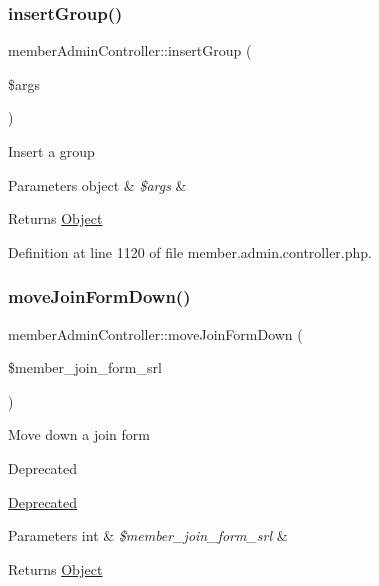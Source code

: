 \subsubsection{\texorpdfstring{insert\+Group()}{insertGroup()}}
{\footnotesize\ttfamily member\+Admin\+Controller\+::insert\+Group (\begin{DoxyParamCaption}\item[{}]{\$args }\end{DoxyParamCaption})}

Insert a group 
\begin{DoxyParams}[1]{Parameters}
object & {\em \$args} & \\
\hline
\end{DoxyParams}
\begin{DoxyReturn}{Returns}
\hyperlink{classObject}{Object} 
\end{DoxyReturn}


Definition at line 1120 of file member.\+admin.\+controller.\+php.

\mbox{\label{classmemberAdminController_a07d6306d7ed6eadca11fdc8ca9eb10d4}} 
\subsubsection{\texorpdfstring{move\+Join\+Form\+Down()}{moveJoinFormDown()}}
{\footnotesize\ttfamily member\+Admin\+Controller\+::move\+Join\+Form\+Down (\begin{DoxyParamCaption}\item[{}]{\$member\+\_\+join\+\_\+form\+\_\+srl }\end{DoxyParamCaption})}

Move down a join form \begin{DoxyRefDesc}{Deprecated}
\item[\hyperlink{deprecated__deprecated000024}{Deprecated}]\end{DoxyRefDesc}

\begin{DoxyParams}[1]{Parameters}
int & {\em \$member\+\_\+join\+\_\+form\+\_\+srl} & \\
\hline
\end{DoxyParams}
\begin{DoxyReturn}{Returns}
\hyperlink{classObject}{Object} 
\end{DoxyReturn}


